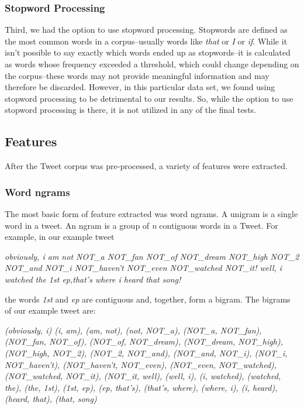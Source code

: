 \documentclass[11pt,letterpaper]{article}
\begin{document}
\subsubsection{Stopword Processing}
Third, we had the option to use stopword processing. Stopwords are defined as the most common words in a corpus--usually words like \emph{that} or \emph{I} or \emph{if}. While it isn't possible to say exactly which words ended up as stopwords--it is calculated as words whose frequency exceeded a  threshold, which could change depending on the corpus--these words may not provide meaningful information and may therefore be discarded. However, in this particular data set, we found using stopword processing to be detrimental to our results. So, while the option to use stopword processing is there, it is not utilized in any of the final tests. 

\subsection{Features}
After the Tweet corpus was pre-processed, a variety of features were extracted.
\subsubsection{Word ngrams}
The most basic form of feature extracted was word ngrams. A unigram is a single word in a tweet. An ngram is a group of \emph{n} contiguous words in a Tweet. For example, in our example tweet

\begin{center}
\textit{obviously, i am not NOT\_a NOT\_fan NOT\_of NOT\_dream NOT\_high NOT\_2 NOT\_and NOT\_i NOT\_haven't NOT\_even NOT\_watched NOT\_it! well, i watched the 1st ep,that's where i heard that song!}
\end{center}

the words \emph{1st} and \emph{ep} are contiguous and, together, form a bigram. The bigrams of our example tweet are:

\begin{center}
\textit{(obviously, i) (i, am), (am, not), (not, NOT\_a), (NOT\_a, NOT\_fan), (NOT\_fan, NOT\_of),  (NOT\_of, NOT\_dream), (NOT\_dream, NOT\_high), (NOT\_high, NOT\_2), (NOT\_2, NOT\_and), (NOT\_and, NOT\_i), (NOT\_i, NOT\_haven't), (NOT\_haven't, NOT\_even), (NOT\_even, NOT\_watched), (NOT\_watched, NOT\_it), (NOT\_it, well), (well, i), (i, watched), (watched, the), (the, 1st), (1st, ep), (ep, that's), (that's, where), (where, i), (i, heard), (heard, that), (that, song)}
\end{center}
\end{document}
